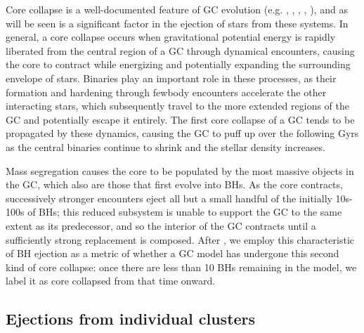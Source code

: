 \documentclass[twocolumn]{aastex631}
\begin{document}
Core collapse is a well-documented feature of GC evolution (e.g. \citealt{1968MNRAS.138..495L}, \citealt{2001A&A...375..711F}, \citealt{2006MNRAS.368..121F}, \citealt{2008gady.book.....B}, \citealt{2020IAUS..351..357K}), and as will be seen is a significant factor in the ejection of stars from these systems.
In general, a core collapse occurs when gravitational potential energy is rapidly liberated from the central region of a GC through dynamical encounters, causing the core to contract while energizing and potentially expanding the surrounding envelope of stars.
Binaries play an important role in these processes, as their formation and hardening through fewbody encounters accelerate the other interacting stars, which subsequently travel to the more extended regions of the GC and potentially escape it entirely.
The first core collapse of a GC tends to be propagated by these dynamics, causing the GC to puff up over the following Gyrs as the central binaries continue to shrink and the stellar density increases.

Mass segregation causes the core to be populated by the most massive objects in the GC, which also are those that first evolve into BHs.
As the core contracts, successively stronger encounters eject all but a small handful of the initially 10s-100s of BHs; this reduced subsystem is unable to support the GC to the same extent as its predecessor, and so the interior of the GC contracts until a sufficiently strong replacement is composed.
After \citet{2020IAUS..351..357K}, we employ this characteristic of BH ejection as a metric of whether a GC model has undergone this second kind of core collapse: once there are less than 10 BHs remaining in the model, we label it as core collapsed from that time onward.

\subsection{Ejections from individual clusters} \label{subsec:single_clusters}
\end{document}
